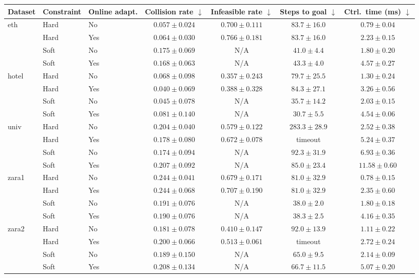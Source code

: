 \begin{tabular}{lllcccc}
\hline
Dataset & Constraint & Online adapt. & Collision rate $\downarrow$ & Infeasible rate $\downarrow$ & Steps to goal $\downarrow$ & Ctrl.\ time (ms) $\downarrow$ \\
\hline
eth & Hard & No & $\mathbf{0.057}\pm0.024$ & $\mathbf{0.700}\pm0.111$ & $\mathbf{83.7}\pm16.0$ & $\mathbf{0.79}\pm0.04$ \\
 & Hard & Yes & $0.064\pm0.030$ & $0.766\pm0.181$ & $\mathbf{83.7}\pm16.0$ & $2.23\pm0.15$ \\
 & Soft & No & $0.175\pm0.069$ & N/A & $\mathbf{41.0}\pm4.4$ & $\mathbf{1.80}\pm0.20$ \\
 & Soft & Yes & $\mathbf{0.168}\pm0.063$ & N/A & $43.3\pm4.0$ & $4.57\pm0.27$ \\
\hline
hotel & Hard & No & $0.068\pm0.098$ & $\mathbf{0.357}\pm0.243$ & $\mathbf{79.7}\pm25.5$ & $\mathbf{1.30}\pm0.24$ \\
 & Hard & Yes & $\mathbf{0.040}\pm0.069$ & $0.388\pm0.328$ & $84.3\pm27.1$ & $3.26\pm0.56$ \\
 & Soft & No & $\mathbf{0.045}\pm0.078$ & N/A & $35.7\pm14.2$ & $\mathbf{2.03}\pm0.15$ \\
 & Soft & Yes & $0.081\pm0.140$ & N/A & $\mathbf{30.7}\pm5.5$ & $4.54\pm0.06$ \\
\hline
univ & Hard & No & $0.204\pm0.040$ & $\mathbf{0.579}\pm0.122$ & $\mathbf{283.3}\pm28.9$ & $\mathbf{2.52}\pm0.38$ \\
 & Hard & Yes & $\mathbf{0.178}\pm0.080$ & $0.672\pm0.078$ & timeout & $5.24\pm0.37$ \\
 & Soft & No & $\mathbf{0.174}\pm0.094$ & N/A & $92.3\pm31.9$ & $\mathbf{6.93}\pm0.36$ \\
 & Soft & Yes & $0.207\pm0.092$ & N/A & $\mathbf{85.0}\pm23.4$ & $11.58\pm0.60$ \\
\hline
zara1 & Hard & No & $0.244\pm0.041$ & $\mathbf{0.679}\pm0.171$ & $\mathbf{81.0}\pm32.9$ & $\mathbf{0.78}\pm0.15$ \\
 & Hard & Yes & $\mathbf{0.244}\pm0.068$ & $0.707\pm0.190$ & $\mathbf{81.0}\pm32.9$ & $2.35\pm0.60$ \\
 & Soft & No & $0.191\pm0.076$ & N/A & $\mathbf{38.0}\pm2.0$ & $\mathbf{1.80}\pm0.18$ \\
 & Soft & Yes & $\mathbf{0.190}\pm0.076$ & N/A & $38.3\pm2.5$ & $4.16\pm0.35$ \\
\hline
zara2 & Hard & No & $\mathbf{0.181}\pm0.078$ & $\mathbf{0.410}\pm0.147$ & $\mathbf{92.0}\pm13.9$ & $\mathbf{1.11}\pm0.22$ \\
 & Hard & Yes & $0.200\pm0.066$ & $0.513\pm0.061$ & timeout & $2.72\pm0.24$ \\
 & Soft & No & $\mathbf{0.189}\pm0.150$ & N/A & $\mathbf{65.0}\pm9.5$ & $\mathbf{2.14}\pm0.09$ \\
 & Soft & Yes & $0.208\pm0.134$ & N/A & $66.7\pm11.5$ & $5.07\pm0.20$ \\
\hline
\end{tabular}
